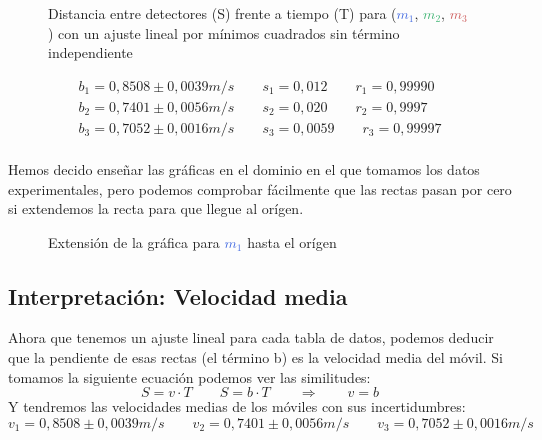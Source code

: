 \documentclass[12pt, a4paper, titlepage]{article}
\begin{document}
  \begin{figure}[H]
    \hspace{-1.8cm} \centering
     

    \hspace{-1.8cm} 
    \caption{Distancia entre detectores (S) frente a tiempo (T) para  (\textcolor{RoyalBlue}{$m_1$}, \textcolor{MediumSeaGreen}{$m_2$}, \textcolor{IndianRed}{$m_3$}) con un ajuste lineal por mínimos cuadrados sin término independiente}
  \end{figure}
  \begin{gather*}
    b_1 = 0,8508 \pm 0,0039 m/s \qquad s_1 = 0,012 \qquad r_1 = 0,99990 \\
    b_2 = 0,7401 \pm 0,0056 m/s \qquad s_2 = 0,020 \qquad r_2 = 0,9997 \\
    b_3 = 0,7052 \pm 0,0016 m/s \qquad s_3 = 0,0059 \qquad r_3 = 0,99997 \\
  \end{gather*}

  \newpage
  Hemos decido enseñar las gráficas en el dominio en el que tomamos los datos experimentales, pero podemos comprobar fácilmente que las rectas pasan por cero si extendemos la recta para que llegue al orígen.

  \begin{figure}[H]
    \hspace{3.5em} 
    \caption{Extensión de la gráfica para \textcolor{RoyalBlue}{$m_1$} hasta el orígen}
  \end{figure}

  \subsection{Interpretación: Velocidad media}

  Ahora que tenemos un ajuste lineal para cada tabla de datos, podemos deducir que la pendiente de esas rectas (el término b) es la velocidad media del móvil. Si tomamos la siguiente ecuación podemos ver las similitudes:
  \begin{equation}
    S = v \cdot T \qquad S = b \cdot T \qquad \Rightarrow  \qquad v = b
  \end{equation}
  Y tendremos las velocidades medias de los móviles con sus incertidumbres:
  \begin{equation*}
    v_1 = 0,8508 \pm 0,0039 m/s \qquad v_2 = 0,7401 \pm 0,0056 m/s \qquad v_3 = 0,7052 \pm 0,0016 m/s
  \end{equation*}
\end{document}
